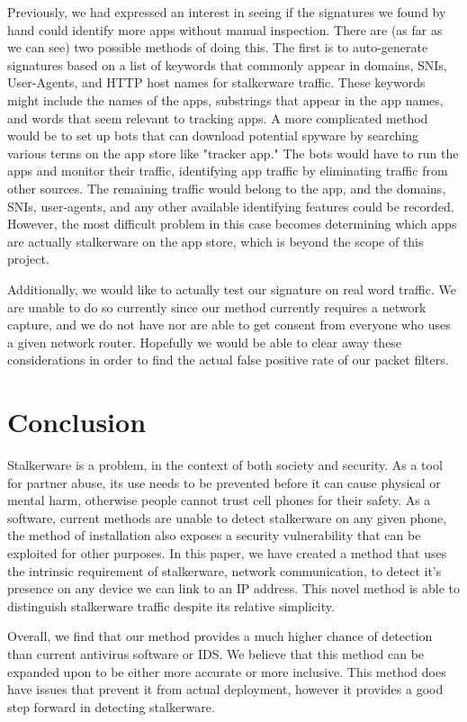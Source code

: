 \documentclass[acmtog]{acmart}
\begin{document}
Previously, we had expressed an interest in seeing if the signatures we found 
by hand could identify more apps without manual inspection. There are (as far 
as we can see) two possible methods of doing this. The first is to 
auto-generate signatures based on a list of keywords that commonly appear in 
domains, SNIs, User-Agents, and HTTP host names for stalkerware traffic. These 
keywords might include the names of the apps, substrings that appear in the app 
names, and words that seem relevant to tracking apps. A more complicated method 
would be to set up bots that can download potential spyware by searching 
various terms on the app store like "tracker app." The bots would have to run 
the apps and monitor their traffic, identifying app traffic by eliminating 
traffic from other sources. The remaining traffic would belong to the app, and 
the domains, SNIs, user-agents, and any other available identifying features 
could be recorded. However, the most difficult problem in this case becomes 
determining which apps are actually stalkerware on the app store, which is 
beyond the scope of this project. 

Additionally, we would like to actually test our signature on real word traffic. We are unable to do so currently since our method currently requires a network capture, and we do not have nor are able to get consent from everyone who uses a given network router. Hopefully we would be able to clear away these considerations in order to find the actual false positive rate of our packet filters.

\section{Conclusion}

Stalkerware is a problem, in the context of both society and security. As a tool for partner abuse, its use needs to be prevented before it can cause physical or mental harm, otherwise people cannot trust cell phones for their safety. As a software, current methods are unable to detect stalkerware on any given phone, the method of installation also exposes a security vulnerability that can be exploited for other purposes. In this paper, we have created a method that uses the intrinsic requirement of stalkerware, network communication, to detect it's presence on any device we can link to an IP address. This novel method is able to distinguish stalkerware traffic despite its relative simplicity.

Overall, we find that our method provides a much higher chance of detection than current antivirus software or IDS. We believe that this method can be expanded upon to be either more accurate or more inclusive. This method does have issues that prevent it from actual deployment, however it provides a good step forward in detecting stalkerware.
\end{document}
